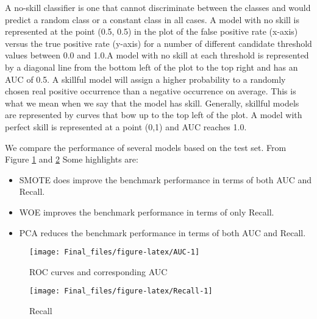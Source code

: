 A no-skill classifier is one that cannot discriminate between the
classes and would predict a random class or a constant class in all
cases. A model with no skill is represented at the point (0.5, 0.5) in
the plot of the false positive rate (x-axis) versus the true positive
rate (y-axis) for a number of different candidate threshold values
between 0.0 and 1.0.A model with no skill at each threshold is
represented by a diagonal line from the bottom left of the plot to the
top right and has an AUC of 0.5. A skillful model will assign a higher
probability to a randomly chosen real positive occurrence than a
negative occurrence on average. This is what we mean when we say that
the model has skill. Generally, skillful models are represented by
curves that bow up to the top left of the plot. A model with perfect
skill is represented at a point (0,1) and AUC reaches 1.0.

We compare the performance of several models based on the test set. From
Figure \ref{fig:AUC} and \ref{fig:Recall} Some highlights are:

\begin{itemize}
\tightlist
\item
  SMOTE does improve the benchmark performance in terms of both AUC and
  Recall.
\item
  WOE improves the benchmark performance in terms of only Recall.
\item
  PCA reduces the benchmark performance in terms of both AUC and Recall.
\end{itemize}

\begin{Schunk}
\begin{figure}

{\centering \texttt{[image: Final\_files/figure-latex/AUC-1]} 

}

\caption[ROC curves and corresponding AUC]{ROC curves and corresponding AUC}\label{fig:AUC}
\end{figure}
\end{Schunk}

\begin{Schunk}
\begin{figure}

{\centering \texttt{[image: Final\_files/figure-latex/Recall-1]} 

}

\caption[Recall]{Recall}\label{fig:Recall}
\end{figure}
\end{Schunk}

